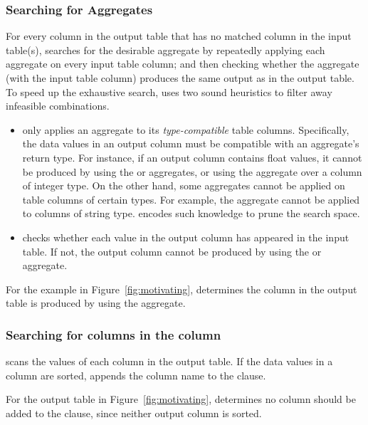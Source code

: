 
\subsubsection{Searching for Aggregates}
\label{sec:agg_search}

For every column in the output table that has no matched
column in the input table(s),
\ourtool searches for the desirable aggregate by
repeatedly applying each aggregate on
every input table column; and then checking whether
the aggregate (with the input table column) produces the same output 
as in the output table. To speed up the exhaustive search,
\ourtool uses two sound heuristics to filter away infeasible
combinations.


\begin{itemize}
\item \ourtool only applies an aggregate
to its \textit{type-compatible} table columns. Specifically,
the data values in an output column must be compatible with an
aggregate's return type. For instance, if an output column
contains float values, it cannot be produced by using the 
or  aggregates, or 
using the  aggregate over a column of integer type.
On the other hand, some aggregates cannot be applied on
table columns of certain types. For example, the 
aggregate cannot be applied to columns of string type.
\ourtool encodes such knowledge to prune the search space.

\item \ourtool checks whether each value in the output
column has appeared in the input table. If not, the
output column cannot be produced by using
the  or  aggregate.
\end{itemize}

For the example in Figure~\ref{fig:motivating}, \ourtool
determines the  column in the output
table is produced by using the  aggregate.



\subsubsection{Searching for columns in the  column}
\label{sec:orderby}
\ourtool scans the values of each column in the output table. If
the data values in a column are sorted, \ourtool
appends the column name to the  clause.

For the output table in Figure~\ref{fig:motivating}, \ourtool
determines no column should be added to the  clause,
since neither output column is sorted.

